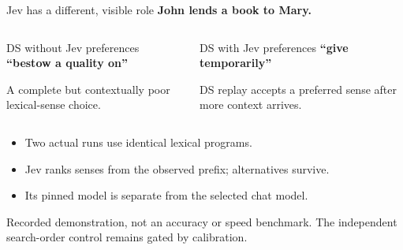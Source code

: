 \documentclass[aspectratio=169,11pt]{beamer}
\newcommand{\tagline}[1]{{\small\color{Accent}\bfseries #1}\par\medskip}
\newcommand{\aside}[1]{\par{\small\color{Muted}#1}\par}
\newcommand{\source}[1]{\par\vfill{\scriptsize\color{Muted}#1}\par}
\begin{document}
\begin{frame}{Jev has a different, visible role}
  \color{Ink}
  \tagline{John lends a book to Mary.}
  \begin{columns}[T,onlytextwidth]
      \begin{block}{DS without Jev preferences}
        \textbf{“bestow a quality on”}\medskip
        \aside{A complete but contextually poor lexical-sense choice.}
      \end{block}
      \begin{block}{DS with Jev preferences}
        \textbf{“give temporarily”}\medskip
        \aside{DS replay accepts a preferred sense after more context arrives.}
      \end{block}
  \end{columns}
  \vspace{4mm}
  \begin{itemize}\setlength\itemsep{6pt}
    \item Two actual runs use identical lexical programs.
    \item Jev ranks senses from the observed prefix; alternatives survive.
    \item Its pinned model is separate from the selected chat model.
  \end{itemize}
  \source{Recorded demonstration, not an accuracy or speed benchmark. The independent search-order control remains gated by calibration.}
\end{frame}
\end{document}
